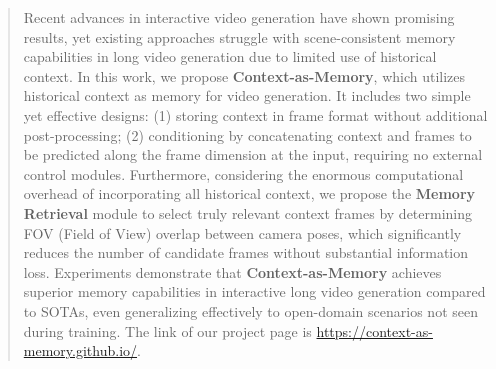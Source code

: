 \begin{abstract}
Recent advances in interactive video generation have shown promising results, yet existing approaches struggle with scene-consistent memory capabilities in long video generation due to limited use of historical context. In this work, we propose \textbf{Context-as-Memory}, which utilizes historical context as memory for video generation. It includes two simple yet effective designs: (1) storing context in frame format without additional post-processing; (2) conditioning by concatenating context and frames to be predicted along the frame dimension at the input, requiring no external control modules. Furthermore, considering the enormous computational overhead of incorporating all historical context, we propose the \textbf{Memory Retrieval} module to select truly relevant context frames by determining FOV (Field of View) overlap between camera poses, which significantly reduces the number of candidate frames without substantial information loss. Experiments demonstrate that \textbf{Context-as-Memory} achieves superior memory capabilities in interactive long video generation compared to SOTAs, even generalizing effectively to open-domain scenarios not seen during training.
The link of our project page is \textcolor{red}{\url{https://context-as-memory.github.io/}}.
\end{abstract}
